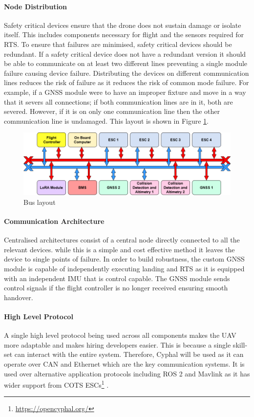 \paragraph{Node Distribution}
Safety critical devices ensure that the drone does not sustain damage or isolate itself. This includes components necessary for flight and the sensors required for \gls{RTS}. To ensure that failures are minimised, safety critical devices should be redundant. If a safety critical device does not have a redundant version it should be able to communicate on at least two different lines preventing a single module failure causing device failure. Distributing the devices on different communication lines reduces the risk of failure as it reduces the risk of common mode failure. For example, if a \gls{GNSS} module were to have an improper fixture and move in a way that it severs all connections; if both communication lines are in it, both are severed. However, if it is on only one communication line then the other communication line is undamaged. This layout is shown in Figure \ref{fig:CAN_bus}. 
 \begin{figure}[h]
 \centering
  \includegraphics[width=1\textwidth]{figs/Thomas/Intra Communication/CAN bus.png}
 \caption{Bus layout}
 \label{fig:CAN_bus}
 \end{figure}
\paragraph{Communication Architecture}
Centralised architectures consist of a central node directly connected to all the relevant devices. while this is a simple and cost effective method it leaves the device to single points of failure. In order to build robustness, the custom \gls{GNSS} module is capable of independently executing landing and \gls{RTS} as it is equipped with an independent \gls{IMU} that is control capable. The \gls{GNSS} module sends control signals if the flight controller is no longer received ensuring smooth handover. 
\paragraph{High Level Protocol}
A single high level protocol being used across all components makes the \gls{UAV} more adaptable and makes hiring developers easier. This is because a single skill-set can interact with the entire system. Therefore, Cyphal will be used as it can operate over \gls{CAN} and Ethernet which are the key communication systems. It is used over alternative application protocols including ROS 2 and Mavlink as it has wider support from \gls{COTS} \gls{ESC}s\footnote{\url{https://opencyphal.org/}} . 